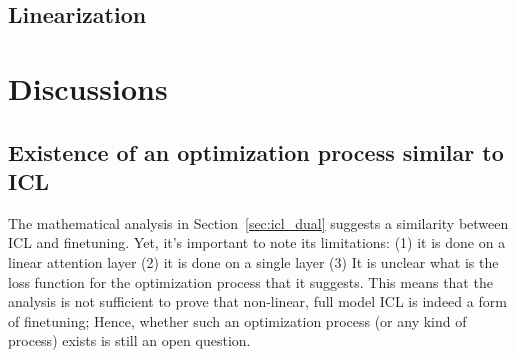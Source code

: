 \documentclass[11pt]{article}
\begin{document}


\subsection{Linearization}

\section{Discussions}
\subsection{Existence of an optimization process similar to ICL}
The mathematical analysis in Section~\ref{sec:icl_dual} suggests a similarity between ICL and finetuning.
Yet, it's important to note its limitations: (1) it is done on a linear attention layer (2) it is done on a single layer
(3) It is unclear what is the loss function for the optimization process that it suggests.
This means that the analysis is not sufficient to prove that non-linear, full model ICL is indeed a form of finetuning;
Hence, whether such an optimization process (or any kind of process) exists is still an open question.
\end{document}
